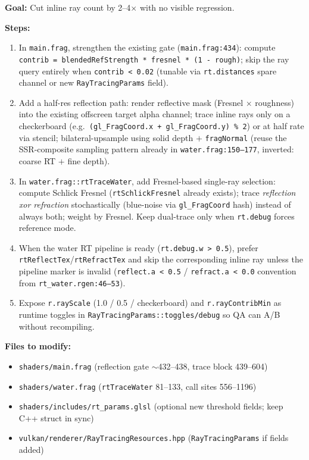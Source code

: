\documentclass[11pt,a4paper]{article}
\begin{document}
\begin{tcolorbox}[promptbox={Prompt: Gate, Downsample, and Upsample Solid/Water Inline Rays}]
\textbf{Goal:} Cut inline ray count by 2--4$\times$ with no visible regression.

\textbf{Steps:}
\begin{enumerate}
    \item In \texttt{main.frag}, strengthen the existing gate (\texttt{main.frag:434}): compute \texttt{contrib = blendedRefStrength * fresnel * (1 - rough)}; skip the ray query entirely when \texttt{contrib \textless{} 0.02} (tunable via \texttt{rt.distances} spare channel or new \texttt{RayTracingParams} field).
    \item Add a half-res reflection path: render reflective mask (Fresnel $\times$ roughness) into the existing offscreen target alpha channel; trace inline rays only on a checkerboard (e.g.\ \texttt{(gl\_FragCoord.x + gl\_FragCoord.y) \% 2}) or at half rate via stencil; bilateral-upsample using solid depth $+$ \texttt{fragNormal} (reuse the SSR-composite sampling pattern already in \texttt{water.frag:150--177}, inverted: coarse RT $+$ fine depth).
    \item In \texttt{water.frag::rtTraceWater}, add Fresnel-based single-ray selection: compute Schlick Fresnel (\texttt{rtSchlickFresnel} already exists); trace \textit{reflection xor refraction} stochastically (blue-noise via \texttt{gl\_FragCoord} hash) instead of always both; weight by Fresnel. Keep dual-trace only when \texttt{rt.debug} forces reference mode.
    \item When the water RT pipeline is ready (\texttt{rt.debug.w \textgreater{} 0.5}), prefer \texttt{rtReflectTex}/\texttt{rtRefractTex} and skip the corresponding inline ray unless the pipeline marker is invalid (\texttt{reflect.a \textless{} 0.5} / \texttt{refract.a \textless{} 0.0} convention from \texttt{rt\_water.rgen:46--53}).
    \item Expose \texttt{r.rayScale} (1.0 / 0.5 / checkerboard) and \texttt{r.rayContribMin} as runtime toggles in \texttt{RayTracingParams::toggles/debug} so QA can A/B without recompiling.
\end{enumerate}

\textbf{Files to modify:}
\begin{itemize}
    \item \texttt{shaders/main.frag} (reflection gate $\sim$432--438, trace block 439--604)
    \item \texttt{shaders/water.frag} (\texttt{rtTraceWater} 81--133, call sites 556--1196)
    \item \texttt{shaders/includes/rt\_params.glsl} (optional new threshold fields; keep C++ struct in sync)
    \item \texttt{vulkan/renderer/RayTracingResources.hpp} (\texttt{RayTracingParams} if fields added)
\end{itemize}


\end{tcolorbox}
\end{document}
